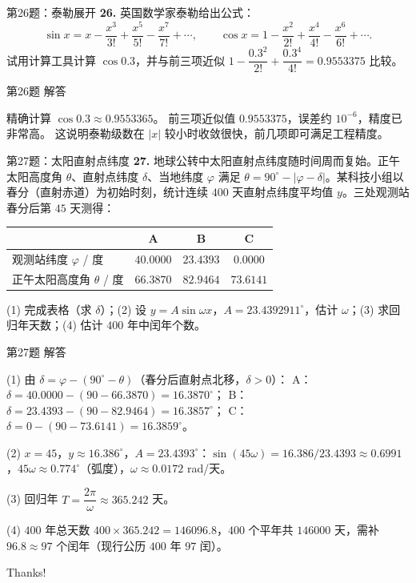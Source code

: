 \documentclass[10pt,aspectratio=169,serif]{beamer}
\begin{document}
\begin{frame}[t]{第26题：泰勒展开}
\textbf{26.} 英国数学家泰勒给出公式：
\[
\sin x=x-\frac{x^3}{3!}+\frac{x^5}{5!}-\frac{x^7}{7!}+\cdots,\qquad
\cos x=1-\frac{x^2}{2!}+\frac{x^4}{4!}-\frac{x^6}{6!}+\cdots.
\]
试用计算工具计算 $\cos 0.3$，并与前三项近似 $1-\dfrac{0.3^2}{2!}+\dfrac{0.3^4}{4!}=0.9553375$ 比较。
\end{frame}

\begin{frame}[t]{第26题 解答}
\begin{tcolorbox}[colback=orange!10,colframe=orange,title=\textbf{解}]
精确计算 $\cos 0.3\approx 0.9553365$。
前三项近似值 $0.9553375$，误差约 $10^{-6}$，精度已非常高。
这说明泰勒级数在 $|x|$ 较小时收敛很快，前几项即可满足工程精度。
\end{tcolorbox}
\end{frame}

\begin{frame}[t]{第27题：太阳直射点纬度}
\textbf{27.} 地球公转中太阳直射点纬度随时间周而复始。正午太阳高度角 $\theta$、直射点纬度 $\delta$、当地纬度 $\varphi$ 满足 $\theta=90^\circ-|\varphi-\delta|$。某科技小组以春分（直射赤道）为初始时刻，统计连续 $400$ 天直射点纬度平均值 $y$。三处观测站春分后第 $45$ 天测得：

\begin{center}
\begin{tabular}{|l|c|c|c|}
\hline
 & A & B & C\\
\hline
观测站纬度 $\varphi$ / 度 & $40.0000$ & $23.4393$ & $0.0000$\\
正午太阳高度角 $\theta$ / 度 & $66.3870$ & $82.9464$ & $73.6141$\\
\hline
\end{tabular}
\end{center}
(1) 完成表格（求 $\delta$）；(2) 设 $y=A\sin\omega x$，$A=23.4392911^\circ$，估计 $\omega$；(3) 求回归年天数；(4) 估计 $400$ 年中闰年个数。
\end{frame}

\begin{frame}[t]{第27题 解答}
\begin{tcolorbox}[colback=orange!10,colframe=orange,title=\textbf{解}]
(1) 由 $\delta=\varphi-(90^\circ-\theta)$（春分后直射点北移，$\delta>0$）：
A：$\delta=40.0000-(90-66.3870)=16.3870^\circ$；
B：$\delta=23.4393-(90-82.9464)=16.3857^\circ$；
C：$\delta=0-(90-73.6141)=16.3859^\circ$。

(2) $x=45$，$y\approx 16.386^\circ$，$A=23.4393^\circ$：$\sin(45\omega)=16.386/23.4393\approx 0.6991$，$45\omega\approx 0.774^\circ$（弧度），$\omega\approx 0.0172$ rad/天。

(3) 回归年 $T=\dfrac{2\pi}{\omega}\approx 365.242$ 天。

(4) $400$ 年总天数 $400\times 365.242=146096.8$，$400$ 个平年共 $146000$ 天，需补 $96.8\approx 97$ 个闰年（现行公历 $400$ 年 $97$ 闰）。
\end{tcolorbox}
\end{frame}

\begin{frame}[c]
  \begin{center}
    {\Huge\calligra Thanks!}
  \end{center}
\end{frame}
\end{document}
